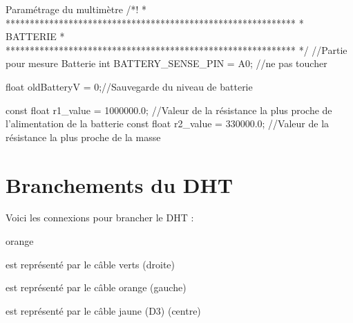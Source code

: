 
\begin{Cpp}{Paramétrage du multimètre}
    /*!
    * ************************************************************
    * BATTERIE
    * ************************************************************
    */
   //Partie pour mesure Batterie
   int BATTERY_SENSE_PIN = A0;  //ne pas toucher
   
   float oldBatteryV = 0;//Sauvegarde du niveau de batterie
   
   const float r1_value = 1000000.0; //Valeur de la résistance la plus proche de l'alimentation de la batterie
   const float r2_value = 330000.0; //Valeur de la résistance la plus proche de la masse

\end{Cpp}




\chapter{Branchements du DHT}


Voici les connexions pour brancher le DHT : 

\begin{items}{orange}{\Triangle}
  \item {} est représenté par le câble verts (droite)
  \item {} est représenté par le câble orange (gauche)
  \item {} est représenté par le câble jaune (D3) (centre)
\end{items}


